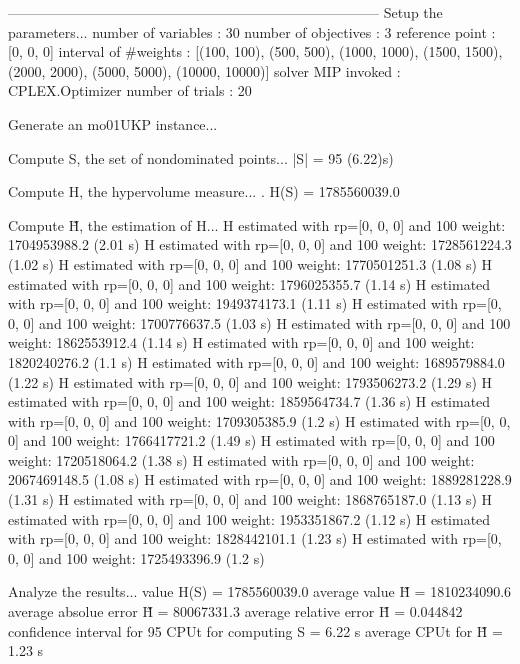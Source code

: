 --------------------------------------------------------------------------------
Setup the parameters...
  number of variables  : 30
  number of objectives : 3
  reference point      : [0, 0, 0]
  interval of #weights : [(100, 100), (500, 500), (1000, 1000), (1500, 1500), (2000, 2000), (5000, 5000), (10000, 10000)]
  solver MIP invoked   : CPLEX.Optimizer
  number of trials     : 20

Generate an mo01UKP instance...

Compute S, the set of nondominated points...
  |S|  = 95 (6.22)s)

Compute H, the hypervolume measure...
. H(S) = 1785560039.0

Compute H̃, the estimation of H...
  H estimated with rp=[0, 0, 0] and 100 weight:  1704953988.2  (2.01 s)
  H estimated with rp=[0, 0, 0] and 100 weight:  1728561224.3  (1.02 s)
  H estimated with rp=[0, 0, 0] and 100 weight:  1770501251.3  (1.08 s)
  H estimated with rp=[0, 0, 0] and 100 weight:  1796025355.7  (1.14 s)
  H estimated with rp=[0, 0, 0] and 100 weight:  1949374173.1  (1.11 s)
  H estimated with rp=[0, 0, 0] and 100 weight:  1700776637.5  (1.03 s)
  H estimated with rp=[0, 0, 0] and 100 weight:  1862553912.4  (1.14 s)
  H estimated with rp=[0, 0, 0] and 100 weight:  1820240276.2  (1.1 s)
  H estimated with rp=[0, 0, 0] and 100 weight:  1689579884.0  (1.22 s)
  H estimated with rp=[0, 0, 0] and 100 weight:  1793506273.2  (1.29 s)
  H estimated with rp=[0, 0, 0] and 100 weight:  1859564734.7  (1.36 s)
  H estimated with rp=[0, 0, 0] and 100 weight:  1709305385.9  (1.2 s)
  H estimated with rp=[0, 0, 0] and 100 weight:  1766417721.2  (1.49 s)
  H estimated with rp=[0, 0, 0] and 100 weight:  1720518064.2  (1.38 s)
  H estimated with rp=[0, 0, 0] and 100 weight:  2067469148.5  (1.08 s)
  H estimated with rp=[0, 0, 0] and 100 weight:  1889281228.9  (1.31 s)
  H estimated with rp=[0, 0, 0] and 100 weight:  1868765187.0  (1.13 s)
  H estimated with rp=[0, 0, 0] and 100 weight:  1953351867.2  (1.12 s)
  H estimated with rp=[0, 0, 0] and 100 weight:  1828442101.1  (1.23 s)
  H estimated with rp=[0, 0, 0] and 100 weight:  1725493396.9  (1.2 s)

Analyze the results...
  value H(S)                  = 1785560039.0 
  average value H̃             = 1810234090.6 
  average absolue error H̃     = 80067331.3 
  average relative error H̃    = 0.044842 
  confidence interval for 95%
  CPUt for computing S         = 6.22 s
  average CPUt for H̃           = 1.23 s

